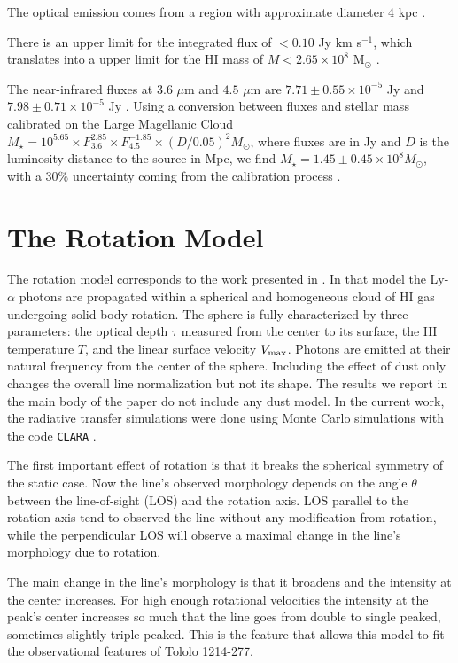 \documentclass[a4paper, usenatbib, 12pt]{article}
\newcommand{\tol}{Tololo 1214-277}
\begin{document}
{The optical emission  comes from a   region with approximate diameter
4 kpc \cite{Fricke01}. 

There is an upper limit for the  
integrated flux of $<0.10$ Jy km s$^{-1}$, which translates into a
upper limit for the HI mass of $M<2.65\times 10^{8}$ M$_{\odot}$
\cite{pustilnikmartin07}.  

The near-infrared fluxes at $3.6$ $\mu$m and $4.5$ $\mu$m are
$7.71\pm0.55\times 10^{-5}$ Jy and $7.98\pm0.71\times 10^{-5}$ Jy
\cite{2008ApJ...678..804E}.  Using a conversion between fluxes and
stellar mass calibrated on the Large Magellanic Cloud $M_{\star} =
10^{5.65} \times F_{3.6}^{2.85} \times F_{4.5}^{-1.85} \times
(D/0.05)^2 M_{\odot}$, where fluxes are in Jy and $D$ is the luminosity
distance to the source in Mpc, we find $M_{\star} = 1.45\pm0.45\times 10^{8}
M_{\odot}$, with a $30\%$ uncertainty coming from the calibration
process \cite{2012AJ....143..139E}.  



\section*{The Rotation Model}

The rotation model corresponds to the work presented in
\cite{GaravitoCamargo2014}. 
In that model the Ly-$\alpha$ photons are propagated 
within a spherical and homogeneous cloud of HI gas undergoing solid
body rotation.
The sphere is fully characterized by three parameters: the optical
depth $\tau$ measured from the center to its surface, the HI
temperature $T$, and the linear surface velocity $V_{\rm max}$.  
Photons are emitted at their natural frequency from the center of the
sphere. 
Including the effect of dust only changes the overall line
normalization but not its shape.  
The results we report in the main body of the paper do not include any
dust model.
In the current work, the radiative transfer simulations were done
using Monte Carlo simulations with the code \texttt{CLARA}
\cite{CLARA}.  

The first important effect of rotation is that it breaks the spherical
symmetry of the static case. 
Now the line's observed morphology depends on the angle $\theta$ between the
line-of-sight (LOS) and the rotation axis. 
LOS parallel to the rotation axis tend to observed the line without
any modification from rotation, while the perpendicular LOS will
observe a maximal change in the line's morphology due to rotation.

The main change in the line's morphology is that it broadens and the
intensity at the center increases. 
For high enough rotational velocities the intensity at the peak's
center increases so much that the line goes from double to single
peaked, sometimes slightly triple peaked.
This is the feature that allows this model to fit the observational
features of \tol.

}
\end{document}

